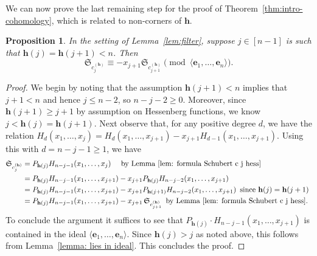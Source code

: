 \documentclass[11pt]{amsart}
\theoremstyle{plain}
\newtheorem{prop}[thm]{Proposition}
\theoremstyle{definition}
\newcommand{\hess}{{\mathbf h}}
\numberwithin{equation}{section}
\begin{document}
We can now prove the last remaining step for the proof of Theorem~\ref{thm:intro-cohomology}, which is related to non-corners
of $\hess$.

\begin{prop}\label{prop:jumps are enough}
In the setting of Lemma~\ref{lem:filter}, suppose $j \in [n-1]$
is such that $\hess(j)=\hess(j+1)<n$. Then
\[
\mathfrak{S}_{c_j^{(\hess)}}
\equiv
-x_{j+1}\mathfrak{S}_{c_{j+1}^{(\hess)}}
\pmod{\langle \mathbf{e}_1,\ldots,\mathbf{e}_n\rangle}.
\]
\end{prop}



\begin{proof}
We begin by noting that the assumption $\hess(j+1)<n$ implies that $j+1<n$ and hence $j \leq n-2$, so $n-j-2 \geq 0$. Moreover, since $\hess(j+1)\geq j+1$ by assumption on Hessenberg functions, we know $j < \hess(j)=\hess(j+1)$. 
Next observe that, for any positive degree $d$, 
we have the relation $H_d(x_1,\dots,x_j)=H_d(x_1,\dots,x_{j+1})-x_{j+1}H_{d-1}(x_1,\dots,x_{j+1})$. Using this with $d=n-j-1\geq 1$,  we have
\begin{equation*}
    \begin{split}
    \mathfrak{S}_{c_j^{(\hess)}}
&=P_{\hess(j)}H_{n-j-1}(x_1,\ldots,x_j) \quad \textup{ by Lemma~\ref{lem: formula Schubert c j hess}} \\
&=P_{\hess(j)}H_{n-j-1}(x_1,\dots,x_{j+1})-x_{j+1}P_{\hess(j)}H_{n-j-2}(x_1,\ldots,x_{j+1})\\
&=P_{\hess(j)}H_{n-j-1}(x_1,\dots,x_{j+1})-x_{j+1}P_{\hess(j+1)}
H_{n-j-2}(x_1,\ldots,x_{j+1})
\, \textup{ since $\hess(j)=\hess(j+1)$ } \\
&=P_{\hess(j)}H_{n-j-1}(x_1,\dots,x_{j+1})-x_{j+1}\,\mathfrak{S}_{c_{j+1}^{(\hess)}} \, \textup{ by Lemma~\ref{lem: formula Schubert c j hess}.}
\end{split} 
\end{equation*}
To conclude the argument it suffices to see that $P_{\hess(j)} \cdot H_{n-j-1}(x_1,\ldots,x_{j+1})$ is contained in the ideal $\langle \mathbf{e}_1,\ldots,\mathbf{e}_n\rangle$. Since $\hess(j)>j$ as noted above, this follows from Lemma~\ref{lemma: lies in ideal}.  This concludes the proof. 
\end{proof}
\end{document}
